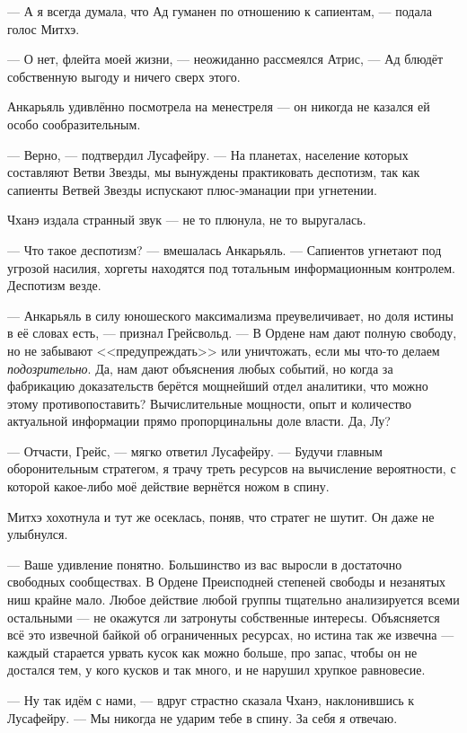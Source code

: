 --- А я всегда думала, что Ад гуманен по отношению к сапиентам, --- подала голос Митхэ.

--- О нет, флейта моей жизни, --- неожиданно рассмеялся Атрис, --- Ад блюдёт собственную выгоду и ничего сверх этого.

Анкарьяль удивлённо посмотрела на менестреля --- он никогда не казался ей особо сообразительным.

--- Верно, --- подтвердил Лусафейру.
--- На планетах, население которых составляют Ветви Звезды, мы вынуждены практиковать деспотизм, так как сапиенты Ветвей Звезды испускают плюс-эманации при угнетении.

Чханэ издала странный звук --- не то плюнула, не то выругалась.

--- Что такое деспотизм? --- вмешалась Анкарьяль.
--- Сапиентов угнетают под угрозой насилия, хоргеты находятся под тотальным информационным контролем.
Деспотизм везде.

--- Анкарьяль в силу юношеского максимализма преувеличивает, но доля истины в её словах есть, --- признал Грейсвольд.
--- В Ордене нам дают полную свободу, но не забывают <<предупреждать>> или уничтожать, если мы что-то делаем \emph{подозрительно}.
Да, нам дают объяснения любых событий, но когда за фабрикацию доказательств берётся мощнейший отдел аналитики, что можно этому противопоставить?
Вычислительные мощности, опыт и количество актуальной информации прямо пропорцинальны доле власти.
Да, Лу?

--- Отчасти, Грейс, --- мягко ответил Лусафейру.
--- Будучи главным оборонительным стратегом, я трачу треть ресурсов на вычисление вероятности, с которой какое-либо моё действие вернётся ножом в спину.

Митхэ хохотнула и тут же осеклась, поняв, что стратег не шутит.
Он даже не улыбнулся.

--- Ваше удивление понятно.
Большинство из вас выросли в достаточно свободных сообществах.
В Ордене Преисподней степеней свободы и незанятых ниш крайне мало.
Любое действие любой группы тщательно анализируется всеми остальными --- не окажутся ли затронуты собственные интересы.
Объясняется всё это извечной байкой об ограниченных ресурсах, но истина так же извечна --- каждый старается урвать кусок как можно больше, про запас, чтобы он не достался тем, у кого кусков и так много, и не нарушил хрупкое равновесие.

--- Ну так идём с нами, --- вдруг страстно сказала Чханэ, наклонившись к Лусафейру.
--- Мы никогда не ударим тебе в спину.
За себя я отвечаю.


